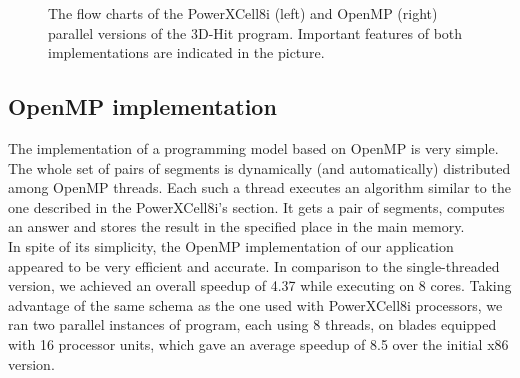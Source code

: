 \begin{figure}[h]
\caption{The flow charts of the PowerXCell8i (left) and OpenMP (right) parallel versions of the 3D-Hit program. Important features of both implementations are indicated in the picture.} \label{fig:figuretwo}
\end{figure}

\subsection{OpenMP implementation}
The implementation of a programming model based on OpenMP is very simple.
The whole set of pairs of segments is dynamically (and automatically)
distributed among OpenMP threads.
Each such a thread executes an algorithm similar to the one described in the 
PowerXCell8i's section.
It gets a pair of segments, computes an answer and stores the result in the
specified place in the main memory.\\
In spite of its simplicity, the OpenMP implementation of our application
appeared to be very efficient and accurate.
In comparison to the single-threaded version, we achieved an overall speedup of
4.37 while executing on 8 cores.
Taking advantage of the same schema as the one used with PowerXCell8i
processors, we ran two parallel instances of \prog{} program, each using 8
threads, on blades equipped with 16 processor units, which
gave an average speedup of 8.5 over the initial x86 version.

